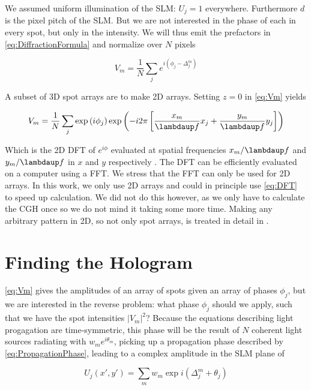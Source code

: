 We assumed uniform illumination of the \ac{SLM}: $U_j =1$ everywhere. Furthermore $d$ is the pixel pitch of the SLM. But we are not interested in the phase of each in every spot, but only in the intensity. We will thus emit the prefactors in \cref{eq:DiffractionFormula} and normalize over $N$ pixels

\begin{equation}\label{eq:Vm}
    V_m = \frac{1}{N} \sum_{j} e^{i(\phi_j - \Delta_j^m)}
\end{equation}

A subset of 3D spot arrays are to make 2D arrays. Setting $z=0$ in \cref{eq:Vm} yields 

\begin{equation}\label{eq:2Dcase}
    V_m = \frac{1}{N} \sum_j \exp{\left(i\phi_j\right)} \exp{\left(
    - i 2\pi \left[
    \frac{x_m}{\lambdaup f} x_j + \frac{y_m}{\lambdaup f} y_j
    \right]
    \right)}
\end{equation}

Which is the 2D \ac{DFT} of $e^{i\phi}$ evaluated at spatial frequencies $x_m/\lambdaup f$ and $y_m/\lambdaup f$ in $x$ and $y$ respectively \cite{DiLeonardo2007,Bijnen2015}. The DFT can be efficiently evaluated on a computer using a \ac{FFT}. We stress that the FFT can only be used for 2D arrays. In this work, we only use 2D arrays and could in principle use \cref{eq:DFT} to speed up calculation. We did not do this however, as we only have to calculate the \ac{CGH} once so we do not mind it taking some more time. Making any arbitrary pattern in 2D, so not only spot arrays, is treated in detail in \cite{Bijnen2013}.  

\section{Finding the Hologram}\label{sec:GSW}

\cref{eq:Vm} gives the amplitudes of an array of spots given an array of phases $\phi_j$, but we are interested in the reverse problem: what phase $\phi_j$ should we apply, such that we have the spot intensities $|V_m|^2$? Because the equations describing light progagation are time-symmetric, this phase will be the result of $N$ coherent light sources radiating with $w_m e^{i \theta_m}$, picking up a propagation phase described by \cref{eq:PropagationPhase}, leading to a complex amplitude in the \ac{SLM} plane of 

\begin{equation}\label{eq:InterferencePattern}
    U_j (x',y') = \sum_m w_m \exp{
    i\left(\Delta_j^m + \theta_j\right)
    }
\end{equation}

